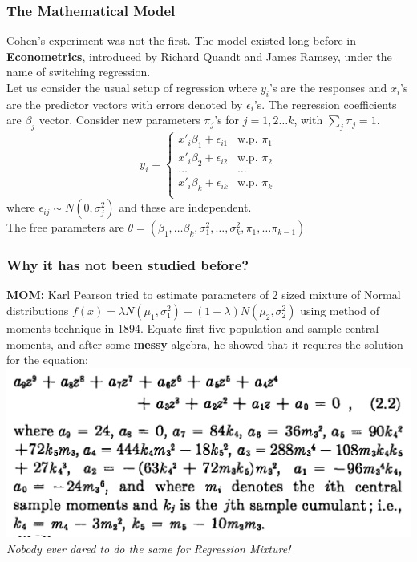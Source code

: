 \documentclass{beamer}
\begin{document}
\begin{frame}
	\frametitle{The Mathematical Model}
	Cohen's experiment was not the first. The model existed long before in \textbf{Econometrics}, introduced by Richard Quandt and James Ramsey, under the name of switching regression.\\
	Let us consider the usual setup of regression where $y_i$'s are the responses and $x_i$'s are the predictor vectors with errors denoted by $\epsilon_i$'s. The regression coefficients are $\beta_j$ vector. Consider new parameters $\pi_j$'s for $j=1,2\dots k$, with $\sum_j \pi_j = 1$.
	$$y_i = \begin{cases}
		{x'}_i \beta_1 + \epsilon_{i1} & \text{w.p. } \pi_1\\
		{x'}_i \beta_2 + \epsilon_{i2} & \text{w.p. } \pi_2\\
		\dots & \dots \\
		{x'}_i \beta_k + \epsilon_{ik} & \text{w.p. } \pi_k\\
	\end{cases}$$
	where $\epsilon_{ij} \sim N(0, \sigma_j^2)$ and these are independent.\\
	The free parameters are $\theta = \left( \beta_1, \dots \beta_k, \sigma_1^2, \dots, \sigma_k^2, \pi_1,\dots \pi_{k-1} \right)$
\end{frame}
\begin{frame}
	\frametitle{Why it has not been studied before?}
	\textbf{MOM:} Karl Pearson tried to estimate parameters of 2 sized mixture of Normal distributions $f(x) = \lambda N(\mu_1, \sigma_1^2) + (1-\lambda) N(\mu_2, \sigma_2^2)$ using method of moments technique in 1894. Equate first five population and sample central moments, and after some \textbf{messy} algebra, he showed that it requires the solution for the equation;
	\includegraphics[width = 0.8\linewidth]{./nonic.png}\\
	\textit{Nobody ever dared to do the same for Regression Mixture!}
\end{frame}
\end{document}
